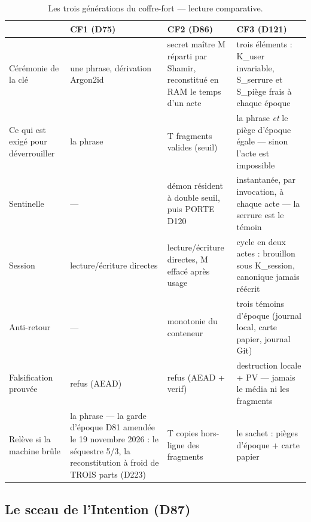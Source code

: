 \begin{table}[htbp]
\centering\small
\caption{Les trois générations du coffre-fort — lecture comparative.}
\label{tab:comparatif}
\begin{tabularx}{\textwidth}{@{}l Y Y Y@{}}
\toprule
 & \textbf{CF1 (D75)} & \textbf{CF2 (D86)} & \textbf{CF3 (D121)} \\
\midrule
Cérémonie de la clé & une phrase, dérivation Argon2id & secret maître M réparti par
Shamir, reconstitué en RAM le temps d'un acte & trois éléments : K\_user invariable,
S\_serrure et S\_piège frais à chaque époque \\
Ce qui est exigé pour déverrouiller & la phrase & T fragments valides (seuil) & la
phrase \emph{et} le piège d'époque égale — sinon l'acte est impossible \\
Sentinelle & — & démon résident à double seuil, puis PORTE D120 & instantanée, par
invocation, à chaque acte — la serrure est le témoin \\
Session & lecture/écriture directes & lecture/écriture directes, M effacé après usage &
cycle en deux actes : brouillon sous K\_session, canonique jamais réécrit \\
Anti-retour & — & monotonie du conteneur & trois témoins d'époque (journal local,
carte papier, journal Git) \\
Falsification prouvée & refus (AEAD) & refus (AEAD + verif) & destruction locale + PV —
jamais le média ni les fragments \\
Relève si la machine brûle & la phrase — la garde d'époque D81 amendée le
19 novembre 2026 : le séquestre 5/3, la reconstitution à froid de TROIS parts
(D223) & T copies hors-ligne des fragments & le sachet : pièges d'époque + carte papier \\
\bottomrule
\end{tabularx}
\end{table}

\subsection{Le sceau de l'Intention (D87)}\label{sec:sceauI}

